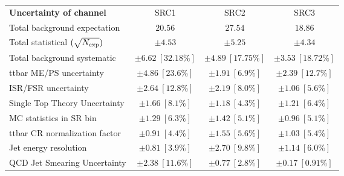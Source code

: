 
\begin{table}
\begin{center}
\setlength{\tabcolsep}{0.0pc}
\begin{tabular*}{\textwidth}{@{\extracolsep{\fill}}lccc}
\noalign{\smallskip}\hline\noalign{\smallskip}
{\bf Uncertainty of channel}                                    & SRC1            & SRC2            & SRC3            \\
\noalign{\smallskip}\hline\noalign{\smallskip}
Total background expectation             &  $20.56$        &  $27.54$        &  $18.86$       \\
\noalign{\smallskip}\hline\noalign{\smallskip}
Total statistical $(\sqrt{N_{\rm exp}})$              & $\pm 4.53$        & $\pm 5.25$        & $\pm 4.34$       \\
Total background systematic               & $\pm 6.62\ [32.18\%] $        & $\pm 4.89\ [17.75\%] $        & $\pm 3.53\ [18.72\%] $             \\
\noalign{\smallskip}\hline\noalign{\smallskip}
\noalign{\smallskip}\hline\noalign{\smallskip}
ttbar ME/PS uncertainty         & $\pm 4.86\ [23.6\%] $          & $\pm 1.91\ [6.9\%] $          & $\pm 2.39\ [12.7\%] $       \\
ISR/FSR uncertainty                                & $\pm 2.64\ [12.8\%] $          & $\pm 2.19\ [8.0\%] $          & $\pm 1.06\ [5.6\%] $       \\
Single Top Theory Uncertainty          & $\pm 1.66\ [8.1\%] $          & $\pm 1.18\ [4.3\%] $          & $\pm 1.21\ [6.4\%] $       \\
MC statistics in SR bin        & $\pm 1.29\ [6.3\%] $          & $\pm 1.42\ [5.1\%] $            & $\pm 0.96\ [5.1\%] $       \\
ttbar CR normalization factor         & $\pm 0.91\ [4.4\%] $          & $\pm 1.55\ [5.6\%] $          & $\pm 1.03\ [5.4\%] $       \\
Jet energy resolution         & $\pm 0.81\ [3.9\%] $          & $\pm 2.70\ [9.8\%] $          & $\pm 1.14\ [6.0\%] $       \\
QCD Jet Smearing Uncertainty        & $\pm 2.38\ [11.6\%] $          & $\pm 0.77\ [2.8\%] $          & $\pm 0.17\ [0.91\%] $       \\

\end{tabular*}
\end{center}
\end{table}
